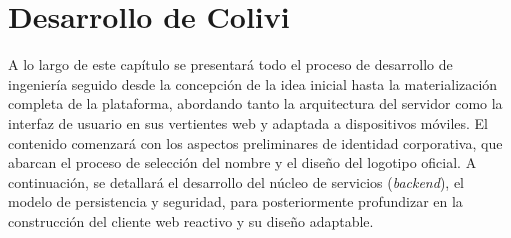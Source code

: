 \chapter{Desarrollo de Colivi}
\label{chap:desarrollo_colivi}

A lo largo de este capítulo se presentará todo el proceso de desarrollo de ingeniería seguido desde la concepción de la idea inicial hasta la materialización completa de la plataforma, abordando tanto la arquitectura del servidor como la interfaz de usuario en sus vertientes web y adaptada a dispositivos móviles. El contenido comenzará con los aspectos preliminares de identidad corporativa, que abarcan el proceso de selección del nombre y el diseño del logotipo oficial. A continuación, se detallará el desarrollo del núcleo de servicios (\emph{backend}), el modelo de persistencia y seguridad, para posteriormente profundizar en la construcción del cliente web reactivo y su diseño adaptable.




